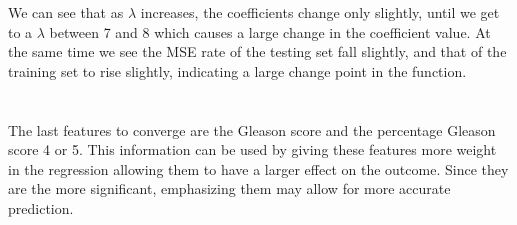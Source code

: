 \documentclass[paper=a4, fontsize=11pt]{scrartcl} %
\numberwithin{equation}{section} %
\numberwithin{figure}{section} %
\numberwithin{table}{section} %
\begin{document}
	We can see that as $\lambda$ increases, the coefficients change only slightly, until we get to a $\lambda$ between 7 and 8 which causes a large change in the coefficient value. At the same time we see the MSE rate of the testing set fall slightly, and that of the training set to rise slightly, indicating a large change point in the function. 
	\\\\\\
	The last features to converge are the Gleason score and the percentage Gleason score 4 or 5. This information can be used by giving these features more weight in the regression allowing them to have a larger effect on the outcome. Since they are the more significant, emphasizing them may allow for more accurate prediction.
	
\end{document}
